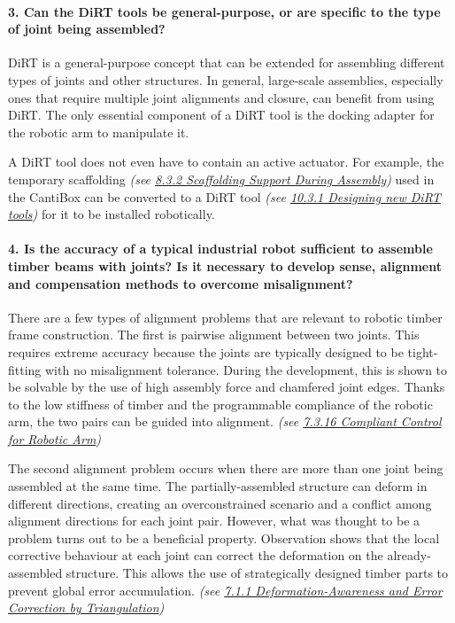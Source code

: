     \paragraph{3. Can the DiRT tools be general-purpose, or are specific to the type of joint being assembled?}

DiRT is a general-purpose concept that can be extended for assembling different types of joints and other structures. In general, large-scale assemblies, especially ones that require multiple joint alignments and closure, can benefit from using DiRT. The only essential component of a DiRT tool is the docking adapter for the robotic arm to manipulate it. 

A DiRT tool does not even have to contain an active actuator. For example, the temporary scaffolding \textit{(see \ul{8.3.2 Scaffolding Support During Assembly})} used in the CantiBox can be converted to a DiRT tool \textit{(see \ul{10.3.1 Designing new DiRT tools}) }for it to be installed robotically.

\paragraph{4. Is the accuracy of a typical industrial robot sufficient to assemble timber beams with joints? Is it necessary to develop sense, alignment and compensation methods to overcome misalignment?}

There are a few types of alignment problems that are relevant to robotic timber frame construction. The first is pairwise alignment between two joints. This requires extreme accuracy because the joints are typically designed to be tight-fitting with no misalignment tolerance. During the development, this is shown to be solvable by the use of high assembly force and chamfered joint edges. Thanks to the low stiffness of timber and the programmable compliance of the robotic arm, the two pairs can be guided into alignment. \textit{(see \ul{7.3.16 Compliant Control for Robotic Arm})}

The second alignment problem occurs when there are more than one joint being assembled at the same time. The partially-assembled structure can deform in different directions, creating an overconstrained scenario and a conflict among alignment directions for each joint pair. However, what was thought to be a problem turns out to be a beneficial property. Observation shows that the local corrective behaviour at each joint can correct the deformation on the already-assembled structure. This allows the use of strategically designed timber parts to prevent global error accumulation. \textit{(see \ul{7.1.1 Deformation-Awareness and Error Correction by Triangulation})}

